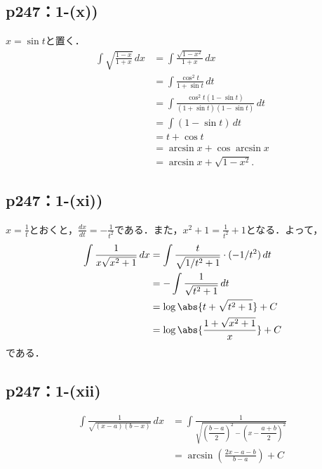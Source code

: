 \documentclass[uplatex,dvipdfmx,a4paper,10pt,fleqn]{jsarticle}
\begin{document}
\subsection*{p247：1-(x))}

  \begin{leftbar}
    $x = \sin t$と置く．
    \begin{align*}
      \int \sqrt {\frac{1-x}{1+x}} \,dx
      &= \int \frac{\sqrt{1-x^2}}{1+x} \,dx \\
      &= \int \frac{\cos^2 t}{1 + \sin t} \,dt \\
      &= \int \frac{\cos^2 t(1 - \sin t)}{(1 + \sin t)(1 - \sin t)} \,dt \\
      &= \int (1 - \sin t) \,dt \\
      &= t + \cos t \\
      &= \arcsin x  + \cos \arcsin x \\
      &= \arcsin x + \sqrt{1-x^2}.
    \end{align*}
  \end{leftbar}

\subsection*{p247：1-(xi))}


\begin{tleftbar}
    $x=\frac{1}{t}$とおくと，$\frac{dx}{dt}=-\frac{1}{t^2}$である．また，$x^2+1 = \frac{1}{t^2} +1$となる．よって，
    \begin{align*} 
        \int \frac{1}{x\sqrt{x^2+1}} \, dx & = \int \frac{t}{\sqrt{1/t^2+1}} \cdot (-1/t^2) \, dt \\
        & = -\int \frac{1}{\sqrt{t^2+1}} \, dt \\
        & = \log \abs{t+\sqrt{t^2+1}}+ C \\
        & = \log \abs{\frac{1+\sqrt{x^2+1}}{x}}+C
    \end{align*}
    である．
\end{tleftbar}


\subsection*{p247：1-(xii)}


\begin{tleftbar}
    \begin{align*} 
        \int \frac{1}{\sqrt{(x-a)(b-x)}} \, dx & = \int \frac{1}{\sqrt{\left (\dfrac{b-a}{2} \right )^2 - \left (x-\dfrac{a+b}{2} \right )^2 }} \\
        & = \arcsin \left (\frac{2x-a-b}{b-a} \right)+C
    \end{align*}
\end{tleftbar}
\end{document}
